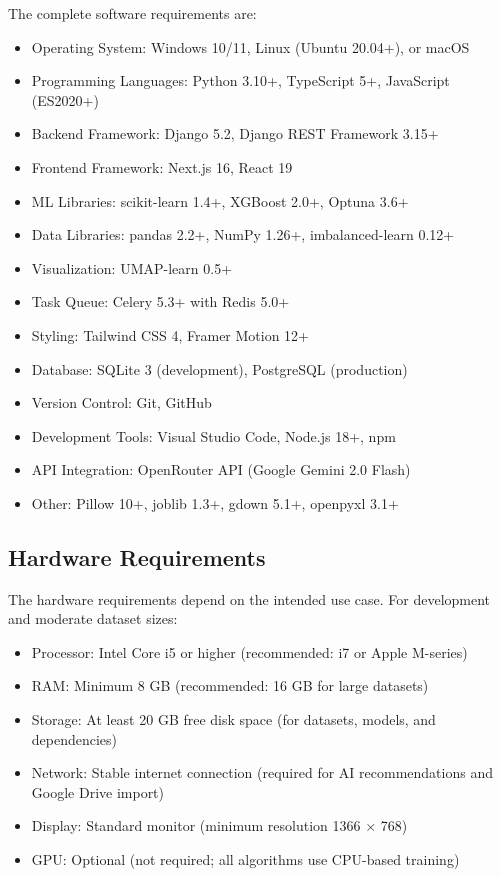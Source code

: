 \documentclass[12pt,a4paper]{report}
\begin{document}
The complete software requirements are:

\begin{itemize}
    \item Operating System: Windows 10/11, Linux (Ubuntu 20.04+), or macOS
    \item Programming Languages: Python 3.10+, TypeScript 5+, JavaScript (ES2020+)
    \item Backend Framework: Django 5.2, Django REST Framework 3.15+
    \item Frontend Framework: Next.js 16, React 19
    \item ML Libraries: scikit-learn 1.4+, XGBoost 2.0+, Optuna 3.6+
    \item Data Libraries: pandas 2.2+, NumPy 1.26+, imbalanced-learn 0.12+
    \item Visualization: UMAP-learn 0.5+
    \item Task Queue: Celery 5.3+ with Redis 5.0+
    \item Styling: Tailwind CSS 4, Framer Motion 12+
    \item Database: SQLite 3 (development), PostgreSQL (production)
    \item Version Control: Git, GitHub
    \item Development Tools: Visual Studio Code, Node.js 18+, npm
    \item API Integration: OpenRouter API (Google Gemini 2.0 Flash)
    \item Other: Pillow 10+, joblib 1.3+, gdown 5.1+, openpyxl 3.1+
\end{itemize}

\subsection{Hardware Requirements}

The hardware requirements depend on the intended use case. For development and moderate dataset sizes:

\begin{itemize}
    \item Processor: Intel Core i5 or higher (recommended: i7 or Apple M-series)
    \item RAM: Minimum 8 GB (recommended: 16 GB for large datasets)
    \item Storage: At least 20 GB free disk space (for datasets, models, and dependencies)
    \item Network: Stable internet connection (required for AI recommendations and Google Drive import)
    \item Display: Standard monitor (minimum resolution 1366 $\times$ 768)
    \item GPU: Optional (not required; all algorithms use CPU-based training)
\end{itemize}
\end{document}
